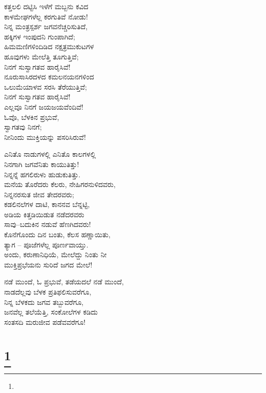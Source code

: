 \begin{myquote}
ಕತ್ತಲಲಿ ದಟ್ಟಿಸಿ ಇಳೆಗೆ ಮಬ್ಬನು ಕವಿದ\\ಕಾಳಮೇಘಗಳೆಲ್ಲ ಕರಗುತಿವೆ ನೋಡು!\\ನಿನ್ನ ಮಂತ್ರಸ್ಪರ್ಶ ಜಗವನೆಚ್ಚರಿಸುತಿದೆ,\\ಹಕ್ಕಿಗಳ ಇಂಪುದನಿ ಗುಂಪಾಗಿದೆ;\\ಹಿಮಮಣಿಗಳಿಂದಿಡಿದ ನಕ್ಷತ್ರಮುಕುಟಗಳ\\ಹೂವುಗಳು ಮೇಲೆತ್ತಿ ತೂಗುತ್ತಿವೆ;\\ನಿನಗೆ ಸುಸ್ವಾಗತವ ಹಾರೈಸಿವೆ!\\ನೂರುಸಾಸಿರದಳದ ಕಮಲನಯನಗಳಿಂದ\\ಒಲುಮೆಯಾಳವ ಸರಸಿ ತೆರೆಯುತ್ತಿವೆ;\\ನಿನಗೆ ಸುಸ್ವಾಗತವ ಹಾರೈಸಿವೆ!\\ಎಲ್ಲವೂ ನಿನಗೆ ಜಯಜಯವೆಂದಿವೆ!\\ಓವೊ, ಬೆಳಕಿನ ಪ್ರಭುವೆ,\\ಸ್ವಾಗತವು ನಿನಗೆ;\\ನೀನಿಂದು ಮುಕ್ತಿಯನ್ನು ಪಸರಿಸಿರುವೆ!
\end{myquote}

\begin{myquote}
ಎನಿತೊ ನಾಡುಗಳಲ್ಲಿ ಎನಿತೊ ಕಾಲಗಳಲ್ಲಿ\\ನಿನಗಾಗಿ ಜಗವೆನಿತು ಕಾಯುತಿತ್ತು!\\ನಿನ್ನನ್ನೆ ಹಗಲಿರುಳು ಹುಡುಕುತಿತ್ತು.\\ಮನೆಯ ತೊರೆದರು ಕೆಲರು, ನೇಹಿಗರನುಳಿದವರು,\\ನಿನ್ನನರಸುತ ಜೀವ ತೇದರವರು;\\ಕಡಲಿನಲೆಗಳ ದಾಟಿ, ಕಾನನವ ಬೆನ್ನಟ್ಟಿ,\\ಅಡಿಯ ಕಿತ್ತಡಿಯಿಡುತ ನಡೆದರವರು\\ಸಾವು–ಬದುಕಿನ ನಡುವೆ ಹೆಣಗಿದವರು!\\ಕೊನೆಗೊಂದು ದಿನ ಬಂತು, ಕೆಲಸ ಹಣ್ಣಾಯಿತು,\\ತ್ಯಾಗ – ಪೂಜೆಗಳೆಲ್ಲ ಪೂರ್ಣವಾಯ್ತು.\\
ಅಂದು, ಕರುಣಾನಿಧಿಯೆ, ಮೇಲೆದ್ದು ನಿಂತು ನೀ\\ಮುಕ್ತಿಪ್ರಭೆಯನು ಸುರಿದೆ ಜಗದ ಮೇಲೆ!
\end{myquote}

\begin{myquote}
ನಡೆ ಮುಂದೆ, ಓ ಪ್ರಭುವೆ, ತಡೆಯದಲೆ ನಡೆ ಮುಂದೆ,\\ನಾಡದೆಲ್ಲವು ಬೆಳಕ ಪ್ರತಿಫಲಿಸುವರೆಗೂ,\\ನಿನ್ನ ಬೆಳಕದು ಜಗವ ತಬ್ಬುವರೆಗೂ,\\ಜನವೆಲ್ಲ ತಲೆಯೆತ್ತಿ, ಸಂಕೋಲೆಗಳ ಕಡಿದು\\ಸಂತಸದಿ ಮರುಜೀವ ಪಡೆವವರೆಗೂ!
\end{myquote}

\selecteng

\chapter[THOU BLESSED DREAM]{\protect\footnote{}}

